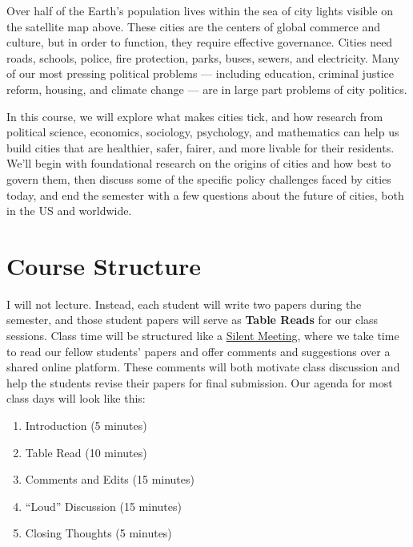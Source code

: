 \documentclass[11pt, letterpaper]{article}
\begin{document}
\noindent Over half of the Earth's population lives within the sea of city lights visible on the satellite map above. These cities are the centers of global commerce and culture, but in order to function, they require effective governance. Cities need roads, schools, police, fire protection, parks, buses, sewers, and electricity. Many of our most pressing political problems --- including education, criminal justice reform, housing, and climate change --- are in large part problems of city politics.

In this course, we will explore what makes cities tick, and how research from political science, economics, sociology, psychology, and mathematics can help us build cities that are healthier, safer, fairer, and more livable for their residents. We'll begin with foundational research on the origins of cities and how best to govern them, then discuss some of the specific policy challenges faced by cities today, and end the semester with a few questions about the future of cities, both in the US and worldwide.



\section*{Course Structure}

I will not lecture. Instead, each student will write two papers during the semester, and those student papers will serve as \textbf{Table Reads} for our class sessions. Class time will be structured like a  \href{https://medium.com/swlh/the-silent-meeting-manifesto-v1-189e9e3487eb}{Silent Meeting}, where we take time to read our fellow students' papers and offer comments and suggestions over a shared online platform. These comments will both motivate class discussion and help the students revise their papers for final submission. Our agenda for most class days will look like this:

\begin{enumerate}
\item Introduction (5 minutes)
\item Table Read (10 minutes)
\item Comments and Edits (15 minutes)
\item ``Loud'' Discussion (15 minutes)
\item Closing Thoughts (5 minutes)	
\end{enumerate}
\end{document}
